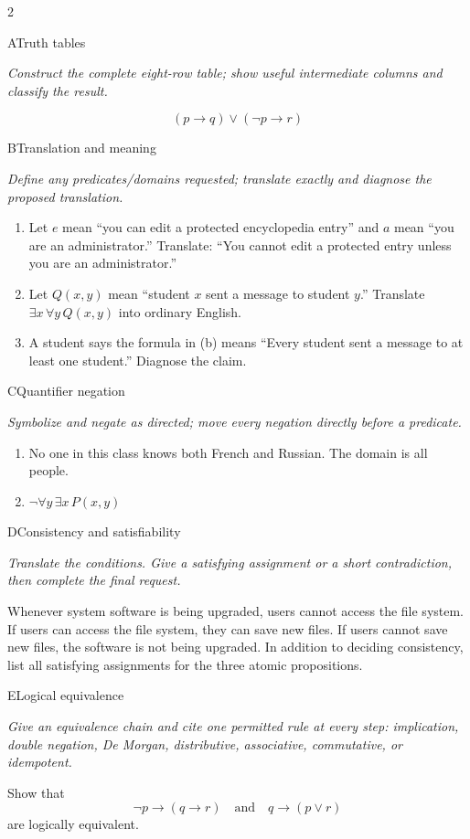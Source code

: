 \documentclass[9pt]{extarticle}
\begin{document}
\begin{multicols}{2}
\begin{CoreProblem}{A}{Truth tables}
{\scriptsize\textit{Construct the complete eight-row table; show useful intermediate columns and classify the result.}\par}
\[
  (p\to q)\lor(\neg p\to r)
\]
\end{CoreProblem}
\begin{CoreProblem}{B}{Translation and meaning}
{\scriptsize\textit{Define any predicates/domains requested; translate exactly and diagnose the proposed translation.}\par}
\begin{enumerate}[label=(\alph*)]
  \item Let $e$ mean ``you can edit a protected encyclopedia entry'' and $a$
        mean ``you are an administrator.'' Translate: ``You cannot edit a
        protected entry unless you are an administrator.''
  \item Let $Q(x,y)$ mean ``student $x$ sent a message to student $y$.''
        Translate $\exists x\,\forall y\,Q(x,y)$ into ordinary English.
  \item A student says the formula in (b) means ``Every student sent a message
        to at least one student.'' Diagnose the claim.
\end{enumerate}
\end{CoreProblem}
\begin{CoreProblem}{C}{Quantifier negation}
{\scriptsize\textit{Symbolize and negate as directed; move every negation directly before a predicate.}\par}
\begin{enumerate}[label=(\alph*)]
  \item No one in this class knows both French and Russian. The domain is all
        people.
  \item $\neg\forall y\,\exists x\,P(x,y)$
\end{enumerate}
\end{CoreProblem}
\columnbreak
\begin{CoreProblem}{D}{Consistency and satisfiability}
{\scriptsize\textit{Translate the conditions. Give a satisfying assignment or a short contradiction, then complete the final request.}\par}
Whenever system software is being upgraded, users cannot access the file
system. If users can access the file system, they can save new files. If users
cannot save new files, the software is not being upgraded. In addition to
deciding consistency, list all satisfying assignments for the three atomic
propositions.
\end{CoreProblem}
\begin{CoreProblem}{E}{Logical equivalence}
{\scriptsize\textit{Give an equivalence chain and cite one permitted rule at every step: implication, double negation, De Morgan, distributive, associative, commutative, or idempotent.}\par}
Show that
\[
  \neg p\to(q\to r)
  \quad\text{and}\quad
  q\to(p\lor r)
\]
are logically equivalent.
\end{CoreProblem}
\end{multicols}
\end{document}
